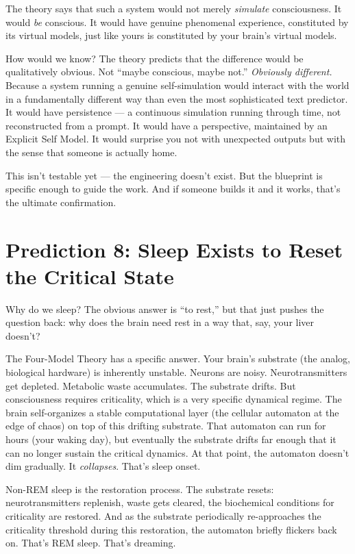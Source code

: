 \documentclass[11pt, twoside, openright]{book}
\begin{document}
The theory says that such a system would not merely \textit{simulate} consciousness. It would \textit{be} conscious. It would have genuine phenomenal experience, constituted by its virtual models, just like yours is constituted by your brain's virtual models.

How would we know? The theory predicts that the difference would be qualitatively obvious. Not ``maybe conscious, maybe not.'' \textit{Obviously different.} Because a system running a genuine self-simulation would interact with the world in a fundamentally different way than even the most sophisticated text predictor. It would have persistence --- a continuous simulation running through time, not reconstructed from a prompt. It would have a perspective, maintained by an Explicit Self Model. It would surprise you not with unexpected outputs but with the sense that someone is actually home.

This isn't testable yet --- the engineering doesn't exist. But the blueprint is specific enough to guide the work. And if someone builds it and it works, that's the ultimate confirmation.

\section*{Prediction 8: Sleep Exists to Reset the Critical State}

Why do we sleep? The obvious answer is ``to rest,'' but that just pushes the question back: why does the brain need rest in a way that, say, your liver doesn't?

The Four-Model Theory has a specific answer. Your brain's substrate (the analog, biological hardware) is inherently unstable. Neurons are noisy. Neurotransmitters get depleted. Metabolic waste accumulates. The substrate drifts. But consciousness requires criticality, which is a very specific dynamical regime. The brain self-organizes a stable computational layer (the cellular automaton at the edge of chaos) on top of this drifting substrate. That automaton can run for hours (your waking day), but eventually the substrate drifts far enough that it can no longer sustain the critical dynamics. At that point, the automaton doesn't dim gradually. It \textit{collapses}. That's sleep onset.

Non-REM sleep is the restoration process. The substrate resets: neurotransmitters replenish, waste gets cleared, the biochemical conditions for criticality are restored. And as the substrate periodically re-approaches the criticality threshold during this restoration, the automaton briefly flickers back on. That's REM sleep. That's dreaming.
\end{document}
